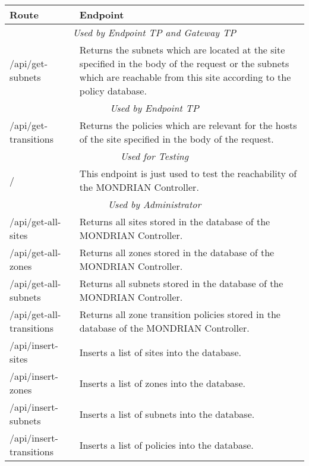 


\begin{table}[t]
\begin{tabular}{@{}p{}p{}@{}}\toprule
\textbf{Route} & \textbf{Endpoint} \\\midrule
\multicolumn{2}{c}{\textit{Used by Endpoint TP and Gateway TP}}\\\midrule
/api/get-subnets & Returns the subnets which are located at the site specified in the body of the request or the subnets which are reachable from this site according to the policy database.\\
\bottomrule
\multicolumn{2}{c}{\textit{Used by Endpoint TP}}\\\midrule
/api/get-transitions & Returns the policies which are relevant for the hosts of the site specified in the body of the request.\\
\bottomrule
\multicolumn{2}{c}{\textit{Used for Testing}}\\\midrule
/ & This endpoint is just used to test the reachability of the MONDRIAN Controller.\\%
\bottomrule
\multicolumn{2}{c}{\textit{Used by Administrator}}\\\midrule
/api/get-all-sites & Returns all sites stored in the database of the MONDRIAN Controller.\\
/api/get-all-zones & Returns all zones stored in the database of the MONDRIAN Controller.\\
/api/get-all-subnets & Returns all subnets stored in the database of the MONDRIAN Controller.\\
/api/get-all-transitions & Returns all zone transition policies stored in the database of the MONDRIAN Controller.\\
/api/insert-sites & Inserts a list of sites into the database.\\
/api/insert-zones & Inserts a list of zones into the database.\\
/api/insert-subnets & Inserts a list of subnets into the database.\\
/api/insert-transitions & Inserts a list of policies into the database.\\

\end{tabular}
\end{table}
